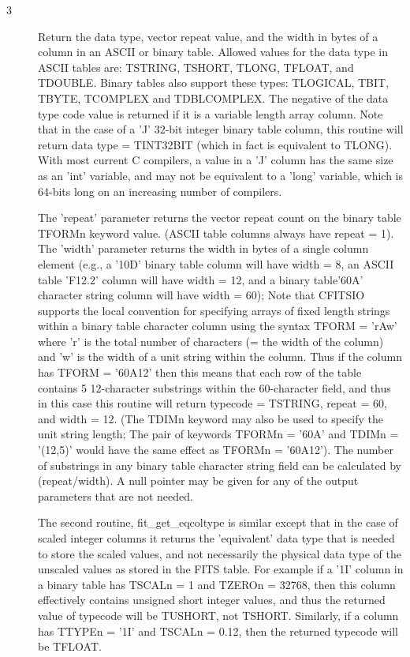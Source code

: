 \documentclass[11pt]{book}
\begin{document}
\begin{description}
\item[3 ] Return the data type, vector repeat value, and the width in bytes
    of a column in an ASCII or binary table.  Allowed values for the
    data type in ASCII tables are:  TSTRING, TSHORT, TLONG, TFLOAT, and
    TDOUBLE.  Binary tables also support these types: TLOGICAL, TBIT,
    TBYTE, TCOMPLEX and TDBLCOMPLEX.  The negative of the data type code
    value is returned if it is a variable length array column.  Note
    that in the case of a 'J' 32-bit integer binary table column, this
    routine will return data type = TINT32BIT (which in fact is
    equivalent to TLONG).  With most current C compilers, a value in a
    'J' column has the same size as an 'int' variable, and may not be
    equivalent to a 'long' variable, which is 64-bits long on an
    increasing number of compilers.

    The 'repeat' parameter returns the vector repeat count on the binary
    table TFORMn keyword value. (ASCII table columns always have repeat
    = 1).  The 'width' parameter returns the width in bytes of a single
    column element (e.g., a '10D' binary table column will have width =
    8, an ASCII table 'F12.2' column will have width = 12, and a binary
    table'60A' character string  column will have width = 60);  Note that
    CFITSIO supports the local convention for specifying arrays of
    fixed length strings within a binary table character column using
    the syntax TFORM = 'rAw' where 'r' is the total number of characters
    (= the width of the column) and 'w' is the width of a unit string
    within the column.  Thus if the column has TFORM = '60A12' then this
    means that each row of the table contains 5 12-character substrings
    within the 60-character field, and thus in this case this routine will
    return typecode = TSTRING, repeat = 60, and width = 12.  (The TDIMn
    keyword may also be used to specify the unit string length; The pair
    of keywords TFORMn = '60A' and TDIMn = '(12,5)'  would have the
    same effect as TFORMn = '60A12').  The number
    of substrings in any binary table character string field can be
    calculated by (repeat/width).  A null pointer may be given for any of
    the output parameters that are not needed.

   The second routine, fit\_get\_eqcoltype is similar except that in
   the case of scaled integer columns it returns the 'equivalent' data
   type that is needed to store the scaled values, and not necessarily
   the physical data type of the unscaled values as stored in the FITS
   table.  For example if a '1I' column in a binary table has TSCALn =
   1 and TZEROn = 32768, then this column effectively contains unsigned
   short integer values, and thus the returned value of typecode will
   be TUSHORT, not TSHORT.  Similarly, if a column has TTYPEn = '1I'
   and TSCALn = 0.12, then the returned typecode
  will be TFLOAT. \label{ffgtcl}
\end{description}
\end{document}
